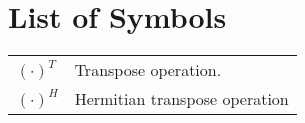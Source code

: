 \chapter*{List of Symbols}
\label{list:LstSym}
\begin{flushleft}
\begin{longtable}{lp{12cm}}
${( \cdot )^T}$	&	Transpose operation.	\\
${( \cdot )^H}$	&	Hermitian transpose operation	\\
\end{longtable}
\end{flushleft}
